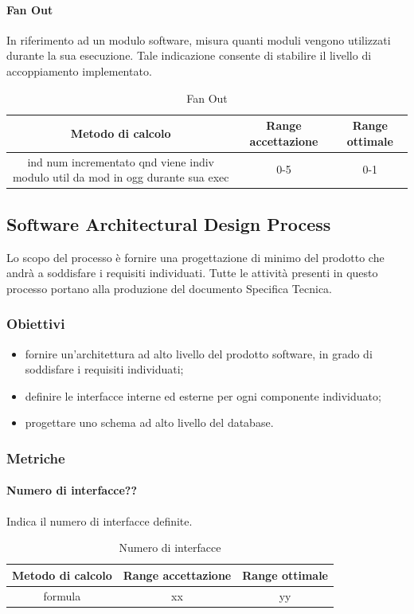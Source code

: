 			\paragraph{Fan Out}
			In riferimento ad un modulo software, misura quanti moduli vengono utilizzati durante la
			sua esecuzione.
			Tale indicazione consente di stabilire il livello di accoppiamento implementato.
			\begin{table}[H]
				\begin{center}
					\begin{tabular}{|c|c|c|}
						\hline
						\textbf{Metodo di calcolo} & \textbf{Range accettazione} & \textbf{Range ottimale} \\
						\hline
						ind num incrementato qnd viene indiv modulo util da mod in ogg durante sua exec & 0-5  & 0-1 \\
						\hline
					\end{tabular}
				\end{center}
				\caption{Fan Out}
			\end{table}
			
	
	\subsection{Software Architectural Design Process}
	Lo scopo del processo è fornire una progettazione di minimo del prodotto che andrà a soddisfare i requisiti individuati.
	Tutte le attività presenti in questo processo portano alla produzione del documento Specifica Tecnica.
		\subsubsection{Obiettivi}
			\begin{itemize}
				\item fornire un'architettura ad alto livello del prodotto software, in grado di soddisfare i requisiti individuati;
				\item definire le interfacce interne ed esterne per ogni componente individuato;
				\item progettare uno schema ad alto livello del database. 
			\end{itemize}

		\subsubsection{Metriche}
			\paragraph{Numero di interfacce??}
			Indica il numero di interfacce definite.
			\begin{table}[H]
				\begin{center}
					\begin{tabular}{|c|c|c|}
						\hline
						\textbf{Metodo di calcolo} & \textbf{Range accettazione} & \textbf{Range ottimale} \\
						\hline
						formula & xx  & yy \\
						\hline
					\end{tabular}
				\end{center}
				\caption{Numero di interfacce}
			\end{table}
		
